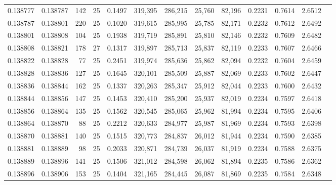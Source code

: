 \begin{tabular}{rrrrrrrrrrrrr}
0.138777 & 0.138787 &   142 &  25 &                                     0.1497 & 319,395 & 286,215 &  25,760 &  82,196 & 0.2231 & 0.7614 & 2.6512 \\
0.138787 & 0.138801 &   220 &  25 &                                     0.1020 & 319,615 & 285,995 &  25,785 &  82,171 & 0.2232 & 0.7612 & 2.6492 \\
0.138801 & 0.138808 &   104 &  25 &                                     0.1938 & 319,719 & 285,891 &  25,810 &  82,146 & 0.2232 & 0.7609 & 2.6482 \\
0.138808 & 0.138821 &   178 &  27 &                                     0.1317 & 319,897 & 285,713 &  25,837 &  82,119 & 0.2233 & 0.7607 & 2.6466 \\
0.138822 & 0.138828 &    77 &  25 &                                     0.2451 & 319,974 & 285,636 &  25,862 &  82,094 & 0.2232 & 0.7604 & 2.6459 \\
0.138828 & 0.138836 &   127 &  25 &                                     0.1645 & 320,101 & 285,509 &  25,887 &  82,069 & 0.2233 & 0.7602 & 2.6447 \\
0.138836 & 0.138844 &   162 &  25 &                                     0.1337 & 320,263 & 285,347 &  25,912 &  82,044 & 0.2233 & 0.7600 & 2.6432 \\
0.138844 & 0.138856 &   147 &  25 &                                     0.1453 & 320,410 & 285,200 &  25,937 &  82,019 & 0.2234 & 0.7597 & 2.6418 \\
0.138856 & 0.138864 &   135 &  25 &                                     0.1562 & 320,545 & 285,065 &  25,962 &  81,994 & 0.2234 & 0.7595 & 2.6406 \\
0.138864 & 0.138870 &    88 &  25 &                                     0.2212 & 320,633 & 284,977 &  25,987 &  81,969 & 0.2234 & 0.7593 & 2.6398 \\
0.138870 & 0.138881 &   140 &  25 &                                     0.1515 & 320,773 & 284,837 &  26,012 &  81,944 & 0.2234 & 0.7590 & 2.6385 \\
0.138881 & 0.138889 &    98 &  25 &                                     0.2033 & 320,871 & 284,739 &  26,037 &  81,919 & 0.2234 & 0.7588 & 2.6375 \\
0.138889 & 0.138896 &   141 &  25 &                                     0.1506 & 321,012 & 284,598 &  26,062 &  81,894 & 0.2235 & 0.7586 & 2.6362 \\
0.138896 & 0.138906 &   153 &  25 &                                     0.1404 & 321,165 & 284,445 &  26,087 &  81,869 & 0.2235 & 0.7584 & 2.6348 \\

\end{tabular}
